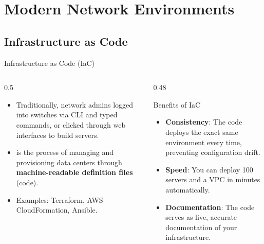 \documentclass[aspectratio=169]{beamer}  %
\begin{document}
\section{Modern Network Environments}
\subsection{Infrastructure as Code}


\begin{frame}[t]{Infrastructure as Code (IaC)}
    \begin{columns}[T]
        \begin{column}{0.5\textwidth}
            \begin{itemize}
                \item Traditionally, network admins logged into switches via CLI and typed commands, or clicked through web interfaces to build servers.
                \item {} is the process of managing and provisioning data centers through \textbf{machine-readable definition files} (code).
                \item Examples: Terraform, AWS CloudFormation, Ansible.
            \end{itemize}
        \end{column}
        \begin{column}{0.48\textwidth}
            \begin{block}{Benefits of IaC}
                \footnotesize
                \begin{itemize}
                    \item \textbf{Consistency}: The code deploys the exact same environment every time, preventing configuration drift.
                    \item \textbf{Speed}: You can deploy 100 servers and a VPC in minutes automatically.
                    \item \textbf{Documentation}: The code serves as live, accurate documentation of your infrastructure.
                \end{itemize}
            \end{block}
        \end{column}
    \end{columns}
\end{frame}
\end{document}
